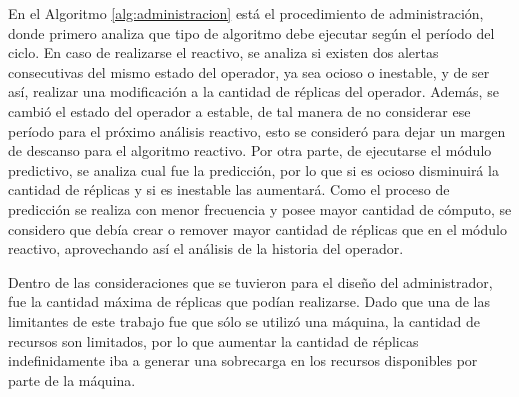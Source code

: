 En el Algoritmo \ref{alg:administracion} está el procedimiento de administración, donde primero analiza que tipo de algoritmo debe ejecutar según el período del ciclo. En caso de realizarse el reactivo, se analiza si existen dos alertas consecutivas del mismo estado del operador, ya sea ocioso o inestable, y de ser así, realizar una modificación a la cantidad de réplicas del operador. Además, se cambió el estado del operador a estable, de tal manera de no considerar ese período para el próximo análisis reactivo, esto se consideró para dejar un margen de descanso para el algoritmo reactivo. Por otra parte, de ejecutarse el módulo predictivo, se analiza cual fue la predicción, por lo que si es ocioso disminuirá la cantidad de réplicas y si es inestable las aumentará. Como el proceso de predicción se realiza con menor frecuencia y posee mayor cantidad de cómputo, se considero que debía crear o remover mayor cantidad de réplicas que en el módulo reactivo, aprovechando así el análisis de la historia del operador.

Dentro de las consideraciones que se tuvieron para el diseño del administrador, fue la cantidad máxima de réplicas que podían realizarse. Dado que una de las limitantes de este trabajo fue que sólo se utilizó una máquina, la cantidad de recursos son limitados, por lo que aumentar la cantidad de réplicas indefinidamente iba a generar una sobrecarga en los recursos disponibles por parte de la máquina.